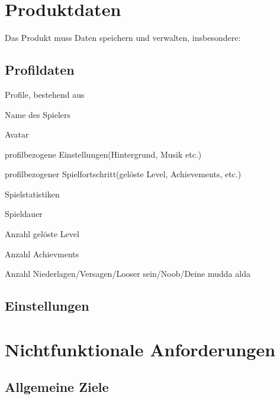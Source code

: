 \documentclass{scrartcl}
\begin{document}
\clearpage

\section{Produktdaten}
Das Produkt muss Daten speichern und verwalten, insbesondere: 

\subsection{Profildaten}

\begin{pdlist}
    \item Profile, bestehend aus 
    \begin{pdlist}
        \item Name des Spielers
        \item Avatar
        \item profilbezogene Einstellungen(Hintergrund, Musik etc.) 
        \item profilbezogener Spielfortschritt(gelöste Level, Achievements, etc.)
    \end{pdlist}
    \item Spielstatistiken
    \begin{pdlist}
        \item Spieldauer
        \item Anzahl gelöste Level
        \item Anzahl Achievments
        \item Anzahl Niederlagen/Versagen/Looser sein/Noob/Deine mudda alda
    \end{pdlist}
\end{pdlist}

\subsection{Einstellungen}

\clearpage


\section{Nichtfunktionale Anforderungen}

\subsection{Allgemeine Ziele}
\end{document}

